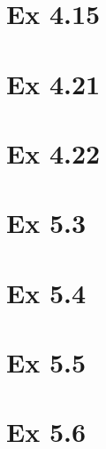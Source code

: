 \documentclass{article}
\begin{document}
\section{Ex 4.15}

\section{Ex 4.21}

\section{Ex 4.22}

\section{Ex 5.3}

\section{Ex 5.4}

\section{Ex 5.5}

\section{Ex 5.6}
\end{document}
